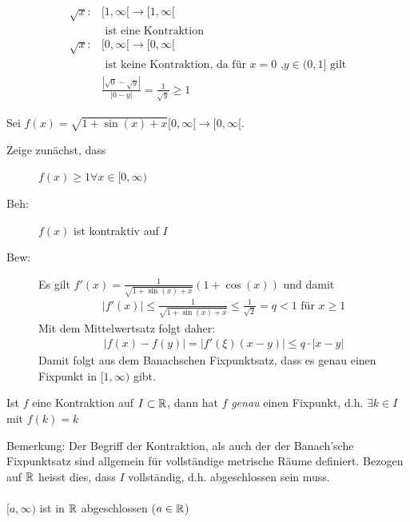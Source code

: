 \documentclass[a4paper]{article}
\begin{document}
		\begin{fmerke}
			\begin{align*}
				\sqrt{x}: &[1, \infty[ \longrightarrow [1, \infty [ \qquad \\
					&\text{ ist eine Kontraktion}\\
				\sqrt{x}: &[0, \infty[ \longrightarrow [0, \infty [ \qquad \\
					&\text{ ist keine Kontraktion, da für  $x=0$ ,$y \in (0,1]$ gilt} \\
				&\frac{|\sqrt{0}-\sqrt{y}|}{|0-y|} = \frac{1}{\sqrt{y}} \geq 1
			\end{align*}
		\end{fmerke}
		\begin{fmerke}
			Sei $f(x)= \sqrt{1+\sin(x)+x} [0, \infty[ \rightarrow [0,\infty [$. 
			\begin{description}
			 \item[Zeige zunächst, dass] $f(x) \geq 1 \forall x \in [0, \infty)$
			 \item[Beh:] $f(x)$ ist kontraktiv auf $I$
			 \item[Bew:] Es gilt $f'(x) = \frac{1}{\sqrt{1+\sin(x)+x}}(1+\cos(x))$ und damit
			 	\begin{align*}
			 		|f'(x)| \leq \frac{1}{\sqrt{1+\sin(x)+x}} \leq \frac{1}{\sqrt{2}} = q < 1 \text{ für } x \geq 1
			 	\end{align*}
				Mit dem Mittelwertsatz folgt daher:
				\begin{align*}
					|f(x)-f(y)| = |f'(\xi)(x-y)| \leq q \cdot |x-y|
				\end{align*}
				Damit folgt aus dem Banachschen Fixpunktsatz, dass es genau einen Fixpunkt in $[1, \infty)$ gibt.
			\end{description}

		\end{fmerke}		
		\begin{fsatz}
			Ist $f$ eine Kontraktion auf $I \subset \mathbb{R}$, dann hat $f$ \emph{genau} einen Fixpunkt, d.h. $\exists k \in I$ mit $f(k)= k$\\
		\end{fsatz}
		\begin{fmerke}Bemerkung: Der Begriff der Kontraktion, als auch der der Banach'sche Fixpunktsatz sind allgemein für vollständige metrische Räume definiert. Bezogen auf $\mathbb{R}$ heisst dies, dass $I$ vollständig, d.h. abgeschlossen sein muss.\\
		\\
		$[a, \infty)$ ist in $\mathbb{R}$ abgeschlossen ($a \in \mathbb{R}$) 
		
		\end{fmerke}
\end{document}
